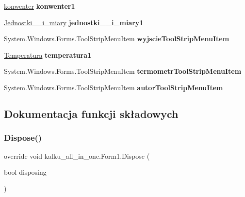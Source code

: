 \begin{DoxyCompactItemize}
\mbox{\hyperlink{classkalku__all__in__one_1_1konwenter}{konwenter}} {\bfseries konwenter1}
\item 
\mbox{\label{classkalku__all__in__one_1_1_form1_a38b3d8730296314bc314ae9f42160d2e}} 
\mbox{\hyperlink{classkalku__all__in__one_1_1_jednostki____i__miary}{Jednostki\+\_\+\+\_\+i\+\_\+miary}} {\bfseries jednostki\+\_\+\+\_\+i\+\_\+miary1}
\item 
\mbox{\label{classkalku__all__in__one_1_1_form1_a1f070e96be70041e152e141d2b8eb329}} 
System.\+Windows.\+Forms.\+Tool\+Strip\+Menu\+Item {\bfseries wyjscie\+Tool\+Strip\+Menu\+Item}
\item 
\mbox{\label{classkalku__all__in__one_1_1_form1_a6539e28efab0c03855b5a0141d44b51a}} 
\mbox{\hyperlink{classkalku__all__in__one_1_1_temperatura}{Temperatura}} {\bfseries temperatura1}
\item 
\mbox{\label{classkalku__all__in__one_1_1_form1_a79d4c40e9c188c5e6aa47b8713d70d3b}} 
System.\+Windows.\+Forms.\+Tool\+Strip\+Menu\+Item {\bfseries termometr\+Tool\+Strip\+Menu\+Item}
\item 
\mbox{\label{classkalku__all__in__one_1_1_form1_a92931a79050871744ca0457ae3160c0d}} 
System.\+Windows.\+Forms.\+Tool\+Strip\+Menu\+Item {\bfseries autor\+Tool\+Strip\+Menu\+Item}
\end{DoxyCompactItemize}


\subsection{Dokumentacja funkcji składowych}
\mbox{\label{classkalku__all__in__one_1_1_form1_a4bd45197a52ffd3416ed40e537314dd7}} 
\subsubsection{\texorpdfstring{Dispose()}{Dispose()}}
{\footnotesize\ttfamily override void kalku\+\_\+all\+\_\+in\+\_\+one.\+Form1.\+Dispose (\begin{DoxyParamCaption}\item[{bool}]{disposing }\end{DoxyParamCaption})\hspace{0.3cm}{\ttfamily [protected]}}



